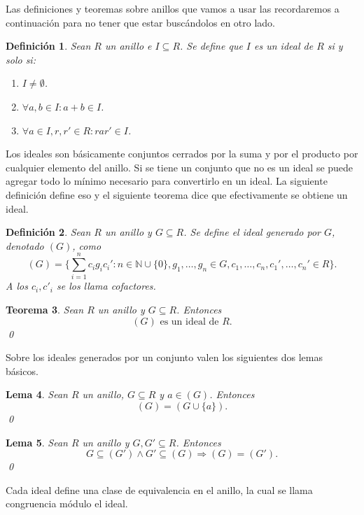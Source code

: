 \documentclass[12pt]{report}
\theoremstyle{customstyle}
\newtheorem{theorem}{Teorema}[chapter]
\newtheorem{definition}[theorem]{Definición}
\newtheorem{lemma}[theorem]{Lema}
\theoremstyle{factstyle}
\begin{document}
Las definiciones y teoremas sobre anillos que vamos a usar las recordaremos a continuación para no tener que estar buscándolos en otro lado.

\begin{definition}\label{def:ideal}
  Sean $R$ un anillo e $I ⊆ R$. Se define que $I$ es un ideal de $R$ si y solo si:
  \begin{enumerate}
    \item $I ≠ ∅$.
    \item $∀a, b ∈ I : a + b ∈ I$.
    \item $∀a ∈ I, r, r' ∈ R : r a r' ∈ I$.
  \end{enumerate}
\end{definition}

Los ideales son básicamente conjuntos cerrados por la suma y por el producto por cualquier elemento del anillo. Si se tiene un conjunto que no es un ideal se puede agregar todo lo mínimo necesario para convertirlo en un ideal. La siguiente definición define eso y el siguiente teorema dice que efectivamente se obtiene un ideal.

\begin{definition}\label{def:ideal gen}
  Sean $R$ un anillo y $G ⊆ R$. Se define el ideal generado por $G$, denotado $(G)$, como
  \[ (G) = \{∑_{i = 1}^n c_i g_i c_i' : n ∈ ℕ ∪ \{0\}, g_1, …, g_n ∈ G, c_1, …, c_n, c_1', …, c_n' ∈ R\} \text{.}\]
  A los $c_i, c'_i$ se los llama cofactores. %
\end{definition}

\begin{theorem}
  Sean $R$ un anillo y $G ⊆ R$. Entonces
  \[ (G)\text{ es un ideal de }R \text{.}\]
  \qed
\end{theorem}

Sobre los ideales generados por un conjunto valen los siguientes dos lemas básicos.

\begin{lemma}\label{lemma:gen G = gen G U a con a ∈ gen G}
  Sean $R$ un anillo, $G ⊆ R$ y $a ∈ (G)$. Entonces
  \[ (G) = (G ∪ \{a\}) \text{.}\]
  \qed
\end{lemma}

\begin{lemma}\label{lemma:sub gen y sub gen ⇒ eq}
  Sean $R$ un anillo y $G, G' ⊆ R$. Entonces
  \[ G ⊆ (G') ∧ G' ⊆ (G) ⇒ (G) = (G') \text{.}\]
  \qed
\end{lemma}


Cada ideal define una clase de equivalencia en el anillo, la cual se llama congruencia módulo el ideal.
\end{document}
